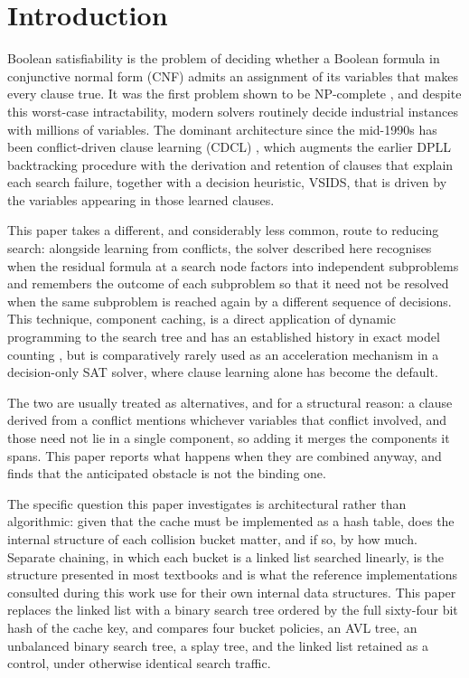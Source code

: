 \documentclass[conference]{IEEEtran}
\begin{document}
\section{Introduction}

Boolean satisfiability is the problem of deciding whether a Boolean formula in conjunctive normal
form (CNF) admits an assignment of its variables that makes every clause true. It was the first
problem shown to be NP-complete \cite{cook1971}, and despite this worst-case intractability,
modern solvers routinely decide industrial instances with millions of variables. The dominant
architecture since the mid-1990s has been conflict-driven clause learning (CDCL)
\cite{marques-silva1999}, which augments the earlier DPLL backtracking procedure
\cite{davis1962} with the derivation and retention of clauses that explain each search failure,
together with a decision heuristic, VSIDS, that is driven by the variables appearing in those
learned clauses.

This paper takes a different, and considerably less common, route to reducing search: alongside
learning from conflicts, the solver described here recognises when the residual formula at a
search node factors into independent subproblems and remembers the outcome of each subproblem so
that it need not be resolved when the same subproblem is reached again by a different sequence of
decisions. This technique, component caching, is a direct application of dynamic programming to
the search tree and has an established history in exact model counting
\cite{bayardo2000,sang2004,thurley2006}, but is comparatively rarely used as an acceleration
mechanism in a decision-only SAT solver, where clause learning alone has become the default.

The two are usually treated as alternatives, and for a structural reason: a clause derived from a
conflict mentions whichever variables that conflict involved, and those need not lie in a single
component, so adding it merges the components it spans. This paper reports what happens when they
are combined anyway, and finds that the anticipated obstacle is not the binding one.

The specific question this paper investigates is architectural rather than algorithmic: given
that the cache must be implemented as a hash table, does the internal structure of each collision
bucket matter, and if so, by how much. Separate chaining, in which each bucket is a linked list
searched linearly, is the structure presented in most textbooks and is what the reference
implementations consulted during this work use for their own internal data structures. This paper
replaces the linked list with a binary search tree ordered by the full sixty-four bit hash of the
cache key, and compares four bucket policies, an AVL tree, an unbalanced binary search tree, a
splay tree, and the linked list retained as a control, under otherwise identical search traffic.
\end{document}
